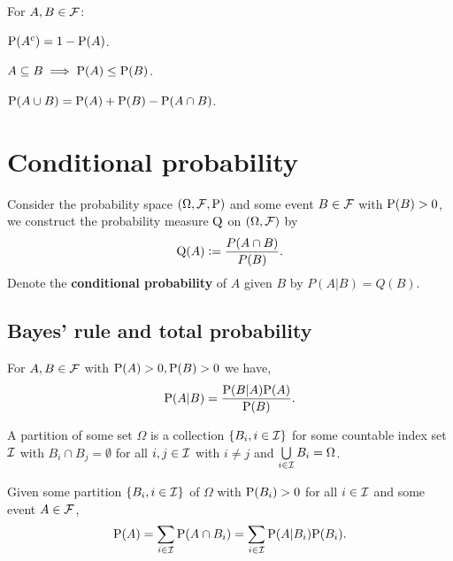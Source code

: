 \begin{corollary} For $A,B \in \FFF$: \newline
    \begin{enumerate*}
        \item $\P(A^c) = 1 - \P(A)$. \hspace{25pt}
        \item $A \subseteq B \implies \P(A) \leq \P(B)$. \hspace{25pt}
        \item $\P(A\cup B) = \P(A) + \P(B) - \P(A\cap B)$.
    \end{enumerate*}
\end{corollary}

\section{Conditional probability}
\begin{definition}
    Consider the probability space $(\Omega, \FFF, \P)$ and some event $B \in \FFF$ with $\P(B) > 0$, we construct the probability measure $\Q$ on $(\Omega, \FFF)$ by \[
        \Q(A):=\frac{P(A\cap B)}{P(B)}\textcolor{black}{.}
    \]
    Denote the \textbf{conditional probability} of $A$ given $B$ by $P(A|B) = Q(B)$.
\end{definition}

\subsection{Bayes' rule and total probability}

\begingroup\belowdisplayskip=-10pt
\begin{theorem}
    For $A,B \in \FFF$ with $\P(A) >0, \P(B) > 0$ we have, \[
        \P(A|B) = \frac{\P(B|A)\P(A)}{\P(B)}
        \textcolor{black}{.}
        \]
\end{theorem}
\endgroup

\begin{definition}
    A partition of some set $\Omega$ is a collection $\{B_i, i \in \III\}$ for some countable index set $\III$ with $B_i \cap B_j = \emptyset$ for all $i,j\in\III$ with $i\neq j$ and $\bigcup\limits_{i\in\III}B_i = \Omega$.
\end{definition}

\begingroup\belowdisplayskip=-10pt
\begin{theorem}
    Given some partition $\{B_i, i\in\III\}$ of $\Omega$ with $\P(B_i)>0$ for all $i\in\III$ and some event $A\in\FFF$,\[
        \P(A)=\sum_{i\in\III}\P(A\cap B_i)=\sum_{i\in\III}\P(A|B_i)\P(B_i)\textcolor{black}{.}
    \]
\end{theorem}
\endgroup

